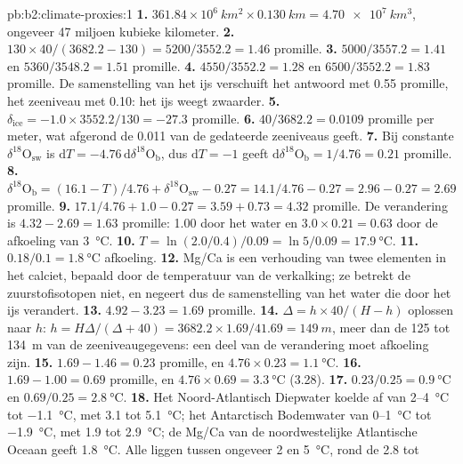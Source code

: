 \begin{solution}{pb:b2:climate-proxies:1}
\textbf{1.} $361.84 \times 10^6\ \unit{km^2} \times \qty{0.130}{km} = \qty{4.70e7}{km^3}$, ongeveer 47
miljoen kubieke kilometer.
\textbf{2.} $130 \times 40/(3682.2 - 130) = 5200/3552.2 = 1.46$ promille.
\textbf{3.} $5000/3557.2 = 1.41$ en $5360/3548.2 = 1.51$ promille.
\textbf{4.} $4550/3552.2 = 1.28$ en $6500/3552.2 = 1.83$ promille. De samenstelling van het ijs
verschuift het antwoord met \num{0.55} promille, het zeeniveau met \num{0.10}: het ijs weegt zwaarder.
\textbf{5.} $\delta_{\mathrm{ice}} = -1.0 \times 3552.2/130 = -27.3$ promille.
\textbf{6.} $40/3682.2 = 0.0109$ promille per meter, wat afgerond de \num{0.011} van de gedateerde
zeeniveaus geeft.
\textbf{7.} Bij constante $\delta^{18}\mathrm{O}_{\mathrm{sw}}$ is $\mathrm{d}T = -4.76\,\mathrm{d}\delta^{18}
\mathrm{O}_{\mathrm{b}}$, dus $\mathrm{d}T = -1$ geeft $\mathrm{d}\delta^{18}\mathrm{O}_{\mathrm{b}} =
1/4.76 = 0.21$ promille.
\textbf{8.} $\delta^{18}\mathrm{O}_{\mathrm{b}} = (16.1 - T)/4.76 + \delta^{18}\mathrm{O}_{\mathrm{sw}}
- 0.27 = 14.1/4.76 - 0.27 = 2.96 - 0.27 = 2.69$ promille.
\textbf{9.} $17.1/4.76 + 1.0 - 0.27 = 3.59 + 0.73 = 4.32$ promille. De verandering is $4.32 - 2.69 =
1.63$ promille: \num{1.00} door het water en $3.0 \times 0.21 = 0.63$ door de afkoeling van
\qty{3}{\celsius}.
\textbf{10.} $T = \ln(2.0/0.4)/0.09 = \ln 5/0.09 = \qty{17.9}{\celsius}$.
\textbf{11.} $0.18/0.1 = \qty{1.8}{\celsius}$ afkoeling.
\textbf{12.} Mg/Ca is een verhouding van twee elementen in het calciet, bepaald door de temperatuur van
de verkalking; ze betrekt de zuurstofisotopen niet, en negeert dus de samenstelling van
het water die door het ijs verandert.
\textbf{13.} $4.92 - 3.23 = 1.69$ promille.
\textbf{14.} $\Delta = h \times 40/(H - h)$ oplossen naar $h$: $h = H\Delta/(\Delta + 40) = 3682.2
\times 1.69/41.69 = \qty{149}{m}$, meer dan de 125 tot \qty{134}{m} van de zeeniveaugegevens:
een deel van de verandering moet afkoeling zijn.
\textbf{15.} $1.69 - 1.46 = 0.23$ promille, en $4.76 \times 0.23 = \qty{1.1}{\celsius}$.
\textbf{16.} $1.69 - 1.00 = 0.69$ promille, en $4.76 \times 0.69 = \qty{3.3}{\celsius}$ (3.28).
\textbf{17.} $0.23/0.25 = \qty{0.9}{\celsius}$ en $0.69/0.25 = \qty{2.8}{\celsius}$.
\textbf{18.} Het Noord-Atlantisch Diepwater koelde af van 2--\qty{4}{\celsius} tot \qty{-1.1}{\celsius},
met 3.1 tot \qty{5.1}{\celsius}; het Antarctisch Bodemwater van 0--\qty{1}{\celsius} tot
\qty{-1.9}{\celsius}, met 1.9 tot \qty{2.9}{\celsius}; de Mg/Ca van de noordwestelijke Atlantische Oceaan geeft
\qty{1.8}{\celsius}. Alle liggen tussen ongeveer 2 en \qty{5}{\celsius}, rond de 2.8 tot

\end{solution}
